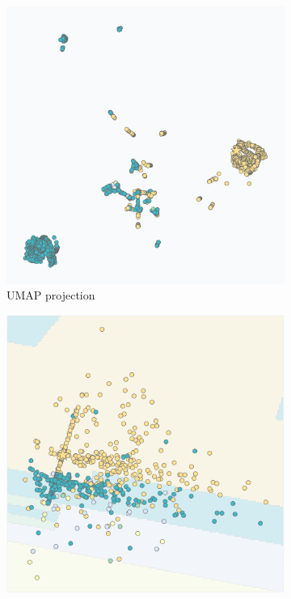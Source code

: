 \begin{figure}[ht]
\centering
\begin{subfigure}[c]{0.48\textwidth}
\centering
\includegraphics[width=\textwidth]{images/ds_scatter_umap_3000.png}
\caption{UMAP projection}
\label{fig:ds_scatter_umap_3000}
\end{subfigure}
\hfill
\begin{subfigure}[c]{0.48\textwidth}
\centering
\includegraphics[width=\textwidth]{images/ds_scatter_pca_3000.png}

\end{subfigure}
\end{figure}
